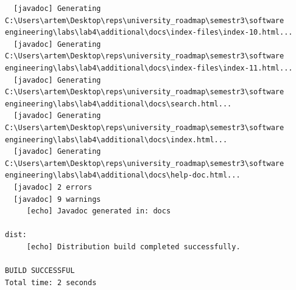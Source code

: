 \documentclass[12pt,a4paper]{article}
\begin{document}
\begin{verbatim}
  [javadoc] Generating C:\Users\artem\Desktop\reps\university_roadmap\semestr3\software engineering\labs\lab4\additional\docs\index-files\index-10.html...
  [javadoc] Generating C:\Users\artem\Desktop\reps\university_roadmap\semestr3\software engineering\labs\lab4\additional\docs\index-files\index-11.html...
  [javadoc] Generating C:\Users\artem\Desktop\reps\university_roadmap\semestr3\software engineering\labs\lab4\additional\docs\search.html...
  [javadoc] Generating C:\Users\artem\Desktop\reps\university_roadmap\semestr3\software engineering\labs\lab4\additional\docs\index.html...
  [javadoc] Generating C:\Users\artem\Desktop\reps\university_roadmap\semestr3\software engineering\labs\lab4\additional\docs\help-doc.html...
  [javadoc] 2 errors
  [javadoc] 9 warnings
     [echo] Javadoc generated in: docs

dist:
     [echo] Distribution build completed successfully.

BUILD SUCCESSFUL
Total time: 2 seconds


\end{verbatim}
\end{document}
